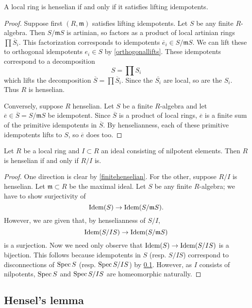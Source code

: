 \begin{proposition} 
A local ring is henselian if and only if it satisfies lifting idempotents. 
\end{proposition}
\begin{proof} 
Suppose first $(R, \mathfrak{m} )$ satisfies lifting idempotents. 
Let $S$ be any finite $R$-algebra. Then $S/\mathfrak{m}S$ is artinian,
so factors as a product of local artinian rings $\prod \overline{S}_i$. This
factorization corresponds to idempotents $\overline{e}_i \in
S/\mathfrak{m}S$.
We can lift these to orthogonal idempotents $e_i \in S$ by
\cref{orthogonallifts}. 
These idempotents correspond to a decomposition 
\[ S = \prod S_i  \]
which lifts the decomposition $\overline{S} = \prod \overline{S}_i$. Since the
$\overline{S_i}$ are local, so are the $S_i$.
Thus $R$ is henselian.

Conversely, suppose $R$ henselian. 
Let $S$ be a finite $R$-algebra and let $\overline{e} \in \overline{S} =
S/\mathfrak{m}S$ be idempotent. Since $\overline{S}$ is a product of local
rings, $\overline{e}$ is a finite sum of the primitive idempotents in
$\overline{S}$. By henselianness, each of these primitive idempotents lifts to
$S$, so $\overline{e}$ does too.
\end{proof}


\begin{proposition} 
Let $R$ be a local ring and $I \subset R$ an ideal consisting of nilpotent
elements. Then $R$ is henselian if and only if
$R/I$ is.
\end{proposition} 
\begin{proof} One direction is clear by \cref{finitehenselian}. For the other,
suppose $R/I$ is henselian. Let $\mathfrak{m} \subset R$ be the maximal ideal.
Let $S$ be any finite $R$-algebra; we have to show surjectivity of 
\[ \operatorname{\text{Idem}}(S) \to \operatorname{\text{Idem}}(S/\mathfrak{m}S).  \]
However, we are given that, by henselianness of $S/I$,
\[ \operatorname{\text{Idem}}(S/IS ) \to \operatorname{\text{Idem}}(S/\mathfrak{m}S)  \]
is a surjection. Now we need only observe that $\operatorname{\text{Idem}}(S) \to \operatorname{\text{Idem}}(S/IS)$ is a 
bijection. This follows because idempotents in $S$ (resp. $S/IS$) correspond
to disconnections of $\operatorname{Spec} S$ (resp. $\operatorname{Spec} S/IS$) by \cref{}. However, as
$I$ consists of nilpotents, $\operatorname{Spec} S$ and $\operatorname{Spec} S/IS$ are homeomorphic
naturally.
\end{proof} 

\subsection{Hensel's lemma}

